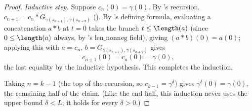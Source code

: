 \begin{proof}
  \emph{Inductive step.} Suppose $c_n(0) = \gamma(0)$. By 's recursion,
  $c_{n+1} = c_n * G_{\gamma(s_{n+1}),\gamma(s_{n+2})}$ (). By
  's defining formula, evaluating a concatenation $a*b$ at $t=0$ takes the
  branch $t \le \length(a)$ (since $0 \le \length(a)$ always, by 's
  $\mathrm{len\_nonneg}$ field), giving $(a*b)(0) = a(0)$; applying this with $a=c_n$,
  $b=G_{\gamma(s_{n+1}),\gamma(s_{n+2})}$ gives
  \[
    c_{n+1}(0) = c_n(0) = \gamma(0)
    ,
  \]
  the last equality by the inductive hypothesis. This completes the induction.

  Taking $n=k-1$ (the top of the recursion, so $c_{k-1}=\gamma^\delta$) gives
  $\gamma^\delta(0) = \gamma(0)$, the remaining half of the claim. (Like the end half, this
  induction never uses the upper bound $\delta<L$; it holds for every $\delta>0$.)
\end{proof}
